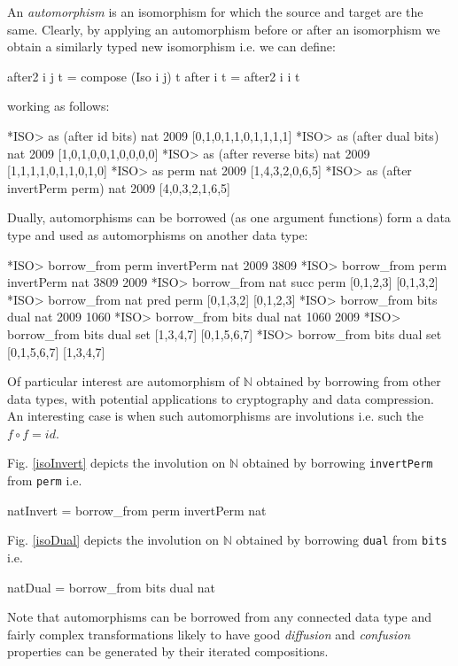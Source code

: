 \documentclass[]{INCLUDES/llncs}
\begin{document}
An {\em automorphism} is an isomorphism for which the source and target 
are the same. Clearly, by applying an automorphism before or after an
isomorphism we obtain a similarly typed new isomorphism i.e. we can define:
\begin{code}
after2 i j t = compose (Iso i j) t
after i t = after2 i i t
\end{code}
working as follows:
\begin{codex}
*ISO> as (after id bits) nat 2009
[0,1,0,1,1,0,1,1,1,1]
*ISO> as (after dual bits) nat 2009
[1,0,1,0,0,1,0,0,0,0]
*ISO> as (after reverse bits) nat 2009
[1,1,1,1,0,1,1,0,1,0]
*ISO> as perm nat 2009
[1,4,3,2,0,6,5]
*ISO> as (after invertPerm perm) nat 2009
[4,0,3,2,1,6,5]
\end{codex}
Dually, automorphisms can be borrowed (as one argument functions) form a
data type and used as automorphisms on another data type:
\begin{codex}
*ISO> borrow_from perm invertPerm nat 2009
3809
*ISO> borrow_from perm invertPerm nat 3809
2009
*ISO> borrow_from nat succ perm [0,1,2,3]
[0,1,3,2]
*ISO> borrow_from nat pred perm [0,1,3,2]
[0,1,2,3]
*ISO> borrow_from bits dual nat 2009
1060
*ISO> borrow_from bits dual nat 1060
2009
*ISO> borrow_from bits dual set [1,3,4,7]
[0,1,5,6,7]
*ISO> borrow_from bits dual set [0,1,5,6,7]
[1,3,4,7]
\end{codex}
Of particular interest are automorphism of $\mathbb{N}$ obtained by borrowing
from other data types, with potential applications to cryptography and data
compression. An interesting case is when such automorphisms are involutions
i.e. such the $f \circ f=id$.

Fig. \ref{isoInvert} depicts the involution on $\mathbb{N}$ obtained by
borrowing {\tt invertPerm} from {\tt perm} i.e.
\begin{code}
natInvert = borrow_from perm invertPerm nat
\end{code}



Fig. \ref{isoDual} depicts the involution on $\mathbb{N}$ obtained by
borrowing {\tt dual} from {\tt bits} i.e.
\begin{code}
natDual = borrow_from bits dual nat
\end{code}


Note that automorphisms can be borrowed from any connected data type and
fairly complex transformations likely to have good {\em diffusion} and {\em
confusion} properties can be generated by their iterated compositions.
\end{document}
